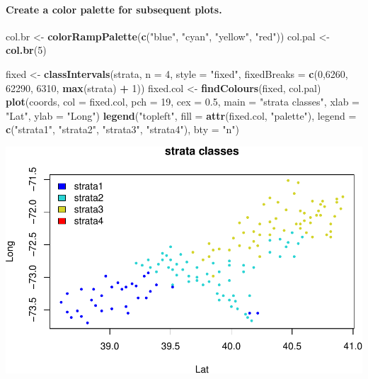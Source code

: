 \documentclass[]{article}
\newenvironment{Shaded}{\begin{snugshade}}{\end{snugshade}}
\newcommand{\KeywordTok}[1]{\textcolor[rgb]{0.13,0.29,0.53}{\textbf{#1}}}
\newcommand{\DataTypeTok}[1]{\textcolor[rgb]{0.13,0.29,0.53}{#1}}
\newcommand{\DecValTok}[1]{\textcolor[rgb]{0.00,0.00,0.81}{#1}}
\newcommand{\FloatTok}[1]{\textcolor[rgb]{0.00,0.00,0.81}{#1}}
\newcommand{\StringTok}[1]{\textcolor[rgb]{0.31,0.60,0.02}{#1}}
\newcommand{\OperatorTok}[1]{\textcolor[rgb]{0.81,0.36,0.00}{\textbf{#1}}}
\newcommand{\NormalTok}[1]{#1}
\let\oldparagraph\paragraph
\renewcommand{\paragraph}[1]{\oldparagraph{#1}\mbox{}}
\begin{document}
\paragraph{Create a color palette for subsequent
plots.}\label{create-a-color-palette-for-subsequent-plots.}

\begin{Shaded}
\begin{Highlighting}[]
\NormalTok{col.br <-}\StringTok{ }\KeywordTok{colorRampPalette}\NormalTok{(}\KeywordTok{c}\NormalTok{(}\StringTok{"blue"}\NormalTok{, }\StringTok{"cyan"}\NormalTok{, }\StringTok{"yellow"}\NormalTok{, }\StringTok{"red"}\NormalTok{))}
\NormalTok{col.pal <-}\StringTok{ }\KeywordTok{col.br}\NormalTok{(}\DecValTok{5}\NormalTok{)}

\NormalTok{fixed <-}\StringTok{ }\KeywordTok{classIntervals}\NormalTok{(strata, }\DataTypeTok{n =} \DecValTok{4}\NormalTok{, }\DataTypeTok{style =} \StringTok{"fixed"}\NormalTok{, }
                        \DataTypeTok{fixedBreaks =} \KeywordTok{c}\NormalTok{(}\DecValTok{0}\NormalTok{,}\DecValTok{6260}\NormalTok{, }\DecValTok{62290}\NormalTok{, }\DecValTok{6310}\NormalTok{, }\KeywordTok{max}\NormalTok{(strata) }\OperatorTok{+}\StringTok{ }\DecValTok{1}\NormalTok{))}
\NormalTok{fixed.col <-}\StringTok{ }\KeywordTok{findColours}\NormalTok{(fixed, col.pal)}
\KeywordTok{plot}\NormalTok{(coords, }\DataTypeTok{col =}\NormalTok{ fixed.col, }\DataTypeTok{pch =} \DecValTok{19}\NormalTok{, }\DataTypeTok{cex =} \FloatTok{0.5}\NormalTok{, }
     \DataTypeTok{main =} \StringTok{"strata classes"}\NormalTok{, }\DataTypeTok{xlab =} \StringTok{"Lat"}\NormalTok{, }\DataTypeTok{ylab =} \StringTok{"Long"}\NormalTok{)}
\KeywordTok{legend}\NormalTok{(}\StringTok{"topleft"}\NormalTok{, }\DataTypeTok{fill =} \KeywordTok{attr}\NormalTok{(fixed.col, }\StringTok{"palette"}\NormalTok{),}
       \DataTypeTok{legend =} \KeywordTok{c}\NormalTok{(}\StringTok{"strata1"}\NormalTok{, }\StringTok{"strata2"}\NormalTok{, }\StringTok{"strata3"}\NormalTok{, }\StringTok{"strata4"}\NormalTok{), }
       \DataTypeTok{bty =} \StringTok{"n"}\NormalTok{)}
\end{Highlighting}
\end{Shaded}

\includegraphics{homework2_files/figure-latex/ex6_color-1.pdf}
\end{document}
